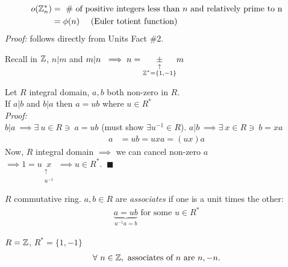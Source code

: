 \setcounter{dummy_lemma}{0}
\begin{corollary}
    \begin{align*}
        o({\mathbb{Z}}_n^*) &= \text{ \# of positive integers less than }n\text{ and relatively prime to n}\\
        &= \phi(n) \ \ \ \ (\text{Euler totient function})
    \end{align*}
    \textit{Proof:} follows directly from Units Fact \#2.
\end{corollary}
Recall in ${\mathbb{Z}}$, $n|m$ and $m|n \ \implies n=\underset{\substack{\uparrow \\ {\mathbb{Z}}^*=\{1,-1\}}}{\pm} m$
\setcounter{dummy_lemma}{1}
\begin{lemma}
    Let $R$ integral domain, $a,b$ both non-zero in $R$. \\
    \noindent If $a|b$ and $b|a$ then $a=ub$ where $u\in R^*$ \\
    \noindent \textit{Proof:} \\
    \noindent $b|a \ \implies \exists \ u \in R \ni \ a=ub$ (must show $\exists u^{-1} \in R$).
    \noindent $a|b \ \implies \exists \ x \in R \ni \ b=xa$
    \begin{align*}
        a&= ub =uxa=(ux)a
    \end{align*}
    Now, $R$ integral domain $\implies$ we can cancel non-zero $a$ \\
    \noindent $\implies 1=u\underset{\substack{\uparrow \\ u^{-1}}}{x} \ \implies u \in R^*$.
    $\ \blacksquare$
\end{lemma}

\begin{definition}[Associates]
    $R$ commutative ring. $a,b\in R$ are \textit{associates} if one is a unit times the other:
    \begin{align*}
        \underbrace{a=ub}_{u^{-1}a=b} \text{ for some } u\in R^*
    \end{align*}
\end{definition}

\begin{example}
    $R={\mathbb{Z}}$, $R^*=\{1,-1\}$
    \begin{align*}
        \forall \ n \in {\mathbb{Z}}, \text{ associates of }n \text{ are }n,-n.
    \end{align*}
\end{example}

